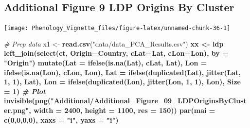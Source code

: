 \documentclass[
]{article}
\newenvironment{Shaded}{\begin{snugshade}}{\end{snugshade}}
\newcommand{\CommentTok}[1]{\textcolor[rgb]{0.56,0.35,0.01}{\textit{#1}}}
\newcommand{\DataTypeTok}[1]{\textcolor[rgb]{0.13,0.29,0.53}{#1}}
\newcommand{\DecValTok}[1]{\textcolor[rgb]{0.00,0.00,0.81}{#1}}
\newcommand{\KeywordTok}[1]{\textcolor[rgb]{0.13,0.29,0.53}{\textbf{#1}}}
\newcommand{\NormalTok}[1]{#1}
\newcommand{\OperatorTok}[1]{\textcolor[rgb]{0.81,0.36,0.00}{\textbf{#1}}}
\newcommand{\StringTok}[1]{\textcolor[rgb]{0.31,0.60,0.02}{#1}}
\begin{document}
\hypertarget{additional-figure-9-ldp-origins-by-cluster}{%
\subsection{Additional Figure 9 LDP Origins By
Cluster}\label{additional-figure-9-ldp-origins-by-cluster}}

\texttt{[image: Phenology\_Vignette\_files/figure-latex/unnamed-chunk-36-1]}

\begin{Shaded}
\begin{Highlighting}[]
\CommentTok{# Prep data}
\NormalTok{x1 <-}\StringTok{ }\KeywordTok{read.csv}\NormalTok{(}\StringTok{"data/data_PCA_Results.csv"}\NormalTok{) }\OperatorTok{%
\NormalTok{xx <-}\StringTok{ }\NormalTok{ldp }\OperatorTok{%
\StringTok{  }\KeywordTok{left_join}\NormalTok{(}\KeywordTok{select}\NormalTok{(ct, }\DataTypeTok{Origin=}\NormalTok{Country, }\DataTypeTok{cLat=}\NormalTok{Lat, }\DataTypeTok{cLon=}\NormalTok{Lon), }\DataTypeTok{by =} \StringTok{"Origin"}\NormalTok{) }\OperatorTok{%
\StringTok{  }\KeywordTok{mutate}\NormalTok{(}\DataTypeTok{Lat =} \KeywordTok{ifelse}\NormalTok{(}\KeywordTok{is.na}\NormalTok{(Lat), cLat, Lat),}
         \DataTypeTok{Lon =} \KeywordTok{ifelse}\NormalTok{(}\KeywordTok{is.na}\NormalTok{(Lon), cLon, Lon),}
         \DataTypeTok{Lat =} \KeywordTok{ifelse}\NormalTok{(}\KeywordTok{duplicated}\NormalTok{(Lat), }\KeywordTok{jitter}\NormalTok{(Lat, }\DecValTok{1}\NormalTok{, }\DecValTok{1}\NormalTok{), Lat),}
         \DataTypeTok{Lon =} \KeywordTok{ifelse}\NormalTok{(}\KeywordTok{duplicated}\NormalTok{(Lon), }\KeywordTok{jitter}\NormalTok{(Lon, }\DecValTok{1}\NormalTok{, }\DecValTok{1}\NormalTok{), Lon), }\DataTypeTok{Size =} \DecValTok{1}\NormalTok{)}
\CommentTok{# Plot}
\KeywordTok{invisible}\NormalTok{(}\KeywordTok{png}\NormalTok{(}\StringTok{"Additional/Additional_Figure_09_LDPOriginsByCluster.png"}\NormalTok{, }
              \DataTypeTok{width =} \DecValTok{2400}\NormalTok{, }\DataTypeTok{height =} \DecValTok{1100}\NormalTok{, }\DataTypeTok{res =} \DecValTok{150}\NormalTok{))}
\KeywordTok{par}\NormalTok{(}\DataTypeTok{mai =} \KeywordTok{c}\NormalTok{(}\DecValTok{0}\NormalTok{,}\DecValTok{0}\NormalTok{,}\DecValTok{0}\NormalTok{,}\DecValTok{0}\NormalTok{), }\DataTypeTok{xaxs =} \StringTok{"i"}\NormalTok{, }\DataTypeTok{yaxs =} \StringTok{"i"}\NormalTok{)}
}}}
\end{Highlighting}
\end{Shaded}
\end{document}
